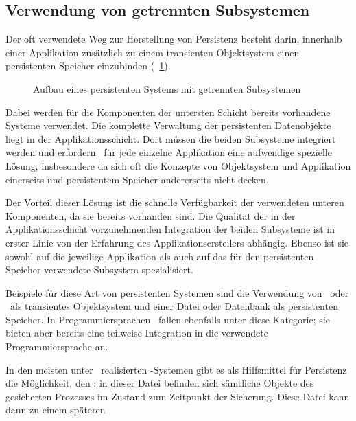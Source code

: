 \subsection{Verwendung von getrennten Subsystemen}
%
Der oft verwendete Weg zur Herstellung von Persistenz besteht darin,
innerhalb einer Applikation zus\"{a}tzlich zu einem
transienten Objektsystem einen persistenten Speicher einzubinden
(\figurename~\ref{fig:hperlay}).
%
\begin{figure}[htbp]%
\ifbuch%
\centerline{}%
\else%
\centerline{}%
\fi%
\caption{Aufbau eines persistenten Systems mit getrennten
Subsystemen}\label{fig:hperlay}%
\end{figure}%
%
Dabei werden f\"{u}r die Komponenten der untersten Schicht bereits
vorhandene Systeme verwendet. Die komplette Verwaltung der
persistenten Datenobjekte liegt in der Applikationsschicht. Dort
m\"{u}ssen die beiden Subsysteme integriert werden und erfordern
\ia\ f\"{u}r jede einzelne Applikation eine aufwendige spezielle
L\"{o}sung, insbesondere da sich oft die Konzepte von Objektsystem und
Applikation einerseits und persistentem Speicher andererseits nicht
decken.
%
\par{}Der Vorteil dieser L\"{o}sung ist die schnelle Verf\"{u}gbarkeit der
verwendeten unteren Komponenten, da sie bereits vorhanden sind. Die
Qualit\"{a}t der in der Applikationsschicht vorzunehmenden Integration
der beiden Subsysteme ist in erster Linie von der Erfahrung des
Applikationserstellers abh\"{a}ngig. Ebenso ist sie sowohl auf die
jeweilige Applikation als auch auf das f\"{u}r den persistenten Speicher
verwendete Subsystem spezialisiert.
%
\par{}Beispiele f\"{u}r diese Art von persistenten Systemen sind die
Verwendung von \cpp\ oder \clos\ als transientes Objektsystem und
einer Datei oder Datenbank als persistenten Speicher. In
Programmiersprachen
\ fallen ebenfalls unter diese Kategorie; sie bieten aber
bereits eine teilweise Integration in die verwendete
Programmiersprache an.
%
\par{}In den meisten unter \unix\ realisierten \cl-Systemen gibt es
als Hilfsmittel f\"{u}r Persistenz die M\"{o}glichkeit, den ; in dieser Datei
befinden sich s\"{a}mtliche Objekte des gesicherten Prozesses im Zustand
zum Zeitpunkt der Sicherung. Diese Datei kann dann zu einem sp\"{a}teren
